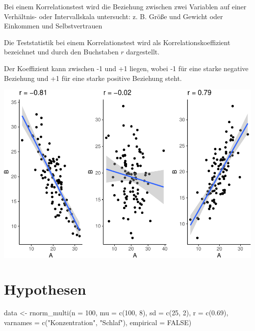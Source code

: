 \documentclass[
]{book}
\newenvironment{Shaded}{\begin{snugshade}}{\end{snugshade}}
\newcommand{\AttributeTok}[1]{\textcolor[rgb]{0.77,0.63,0.00}{#1}}
\newcommand{\ConstantTok}[1]{\textcolor[rgb]{0.00,0.00,0.00}{#1}}
\newcommand{\DecValTok}[1]{\textcolor[rgb]{0.00,0.00,0.81}{#1}}
\newcommand{\FloatTok}[1]{\textcolor[rgb]{0.00,0.00,0.81}{#1}}
\newcommand{\FunctionTok}[1]{\textcolor[rgb]{0.00,0.00,0.00}{#1}}
\newcommand{\NormalTok}[1]{#1}
\newcommand{\OtherTok}[1]{\textcolor[rgb]{0.56,0.35,0.01}{#1}}
\newcommand{\StringTok}[1]{\textcolor[rgb]{0.31,0.60,0.02}{#1}}
\begin{document}
Bei einem Korrelationstest wird die Beziehung zwischen zwei Variablen auf einer Verhältnis- oder Intervallskala untersucht: z. B. Größe und Gewicht oder Einkommen und Selbstvertrauen

Die Teststatistik bei einem Korrelationstest wird als Korrelationskoeffizient bezeichnet und durch den Buchstaben \(r\) dargestellt.

Der Koeffizient kann zwischen -1 und +1 liegen, wobei -1 für eine starke negative Beziehung und +1 für eine starke positive Beziehung steht.

\includegraphics{CFH_R_bookdown_files/figure-latex/unnamed-chunk-206-1.pdf}

\hypertarget{hypothesen}{%
\section{Hypothesen}\label{hypothesen}}

\begin{Shaded}
\begin{Highlighting}[]
\NormalTok{data }\OtherTok{\textless{}{-}} \FunctionTok{rnorm\_multi}\NormalTok{(}\AttributeTok{n =} \DecValTok{100}\NormalTok{, }
                  \AttributeTok{mu =} \FunctionTok{c}\NormalTok{(}\DecValTok{100}\NormalTok{, }\DecValTok{8}\NormalTok{),}
                  \AttributeTok{sd =} \FunctionTok{c}\NormalTok{(}\DecValTok{25}\NormalTok{, }\DecValTok{2}\NormalTok{),}
                  \AttributeTok{r =} \FunctionTok{c}\NormalTok{(}\FloatTok{0.69}\NormalTok{), }
                  \AttributeTok{varnames =} \FunctionTok{c}\NormalTok{(}\StringTok{"Konzentration"}\NormalTok{, }\StringTok{"Schlaf"}\NormalTok{),}
                  \AttributeTok{empirical =} \ConstantTok{FALSE}\NormalTok{)}
\end{Highlighting}
\end{Shaded}
\end{document}
